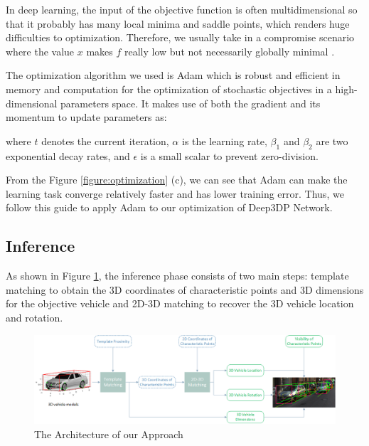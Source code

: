 \documentclass[a4paper,12pt]{article}
\begin{document}
In deep learning, the input of the objective function is often multidimensional so that it probably has many local minima and saddle points, which renders huge difficulties to optimization. Therefore, we usually take in a compromise scenario where the value $x$ makes $f$ really low but not necessarily globally minimal \cite{Goodfellow-et-al-2016}.

The optimization algorithm we used is Adam \cite{DBLP:journals/corr/KingmaB14} which is robust and efficient in memory and computation for the optimization of stochastic objectives in a high-dimensional parameters space. It makes use of both the gradient and its momentum to update parameters as: 

\begin{algorithm}[H]	
\end{algorithm}

where $ t $ denotes the current iteration, $\alpha$ is the learning rate, $\beta_1$ and $\beta_2$ are two exponential decay rates, and $\epsilon$ is a small scalar to prevent zero-division.

From the Figure \ref{figure:optimization} (c), we can see that Adam can make the learning task converge relatively faster and has lower training error. Thus, we follow this guide to apply Adam to our optimization of Deep3DP Network.

\subsection{Inference}
\label{inference}

As shown in Figure \ref{figure:inference}, the inference phase consists of two main steps: template matching to obtain the 3D coordinates of characteristic points and 3D dimensions for the objective vehicle and 2D-3D matching to recover the 3D vehicle location and rotation.

\begin{figure}[h]		
	\includegraphics[width=1\textwidth]{inference_0522.png}
	\caption{The Architecture of our Approach}
	\centering
	\label{figure:inference}
\end{figure}
\end{document}
